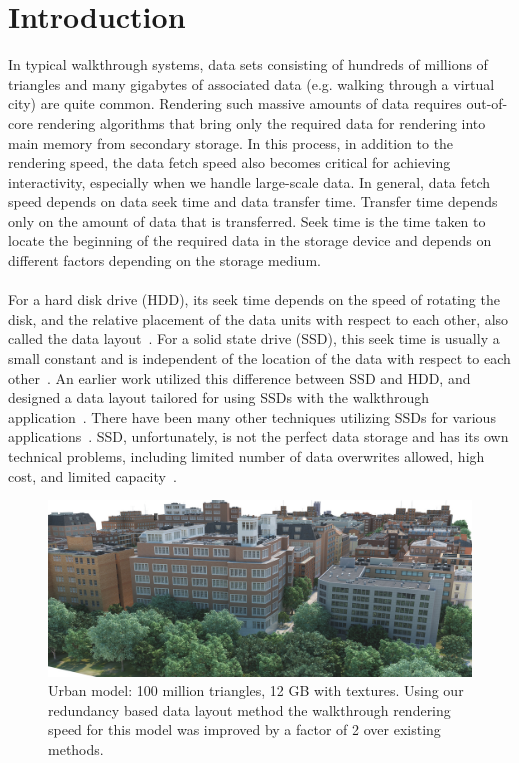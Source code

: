 \section{Introduction}


In typical walkthrough systems, data sets consisting of hundreds of millions of
triangles and many gigabytes of associated data (e.g. walking through a virtual
city) are quite common. Rendering such massive amounts of data requires
out-of-core rendering algorithms that bring only the required data for
rendering into main memory from secondary storage. In this process, in addition
to the rendering speed, the data fetch speed also becomes critical for
achieving interactivity, especially when we handle large-scale data. In
general, data fetch speed depends on data seek time and data transfer time.
Transfer time depends only on the amount of data that is transferred. Seek time
is the time taken to locate the beginning of the required data in the storage
device and depends on different factors depending on the storage medium. \\
\\
For a hard disk drive (HDD), its seek time depends on the speed of rotating the
disk,
and the relative placement of the data units with respect to each other, also
called the data layout~\cite{Rizvi10}. For a solid state drive (SSD), this seek
time is usually a small constant and is independent of the location of the data
with respect to each other~\cite{SSD_perf08}. An earlier work utilized this
difference between SSD and HDD, and designed a data layout tailored for using
SSDs with the walkthrough application~\cite{ssdpaper}. There have been many
other techniques utilizing SSDs for various applications~\cite{FlashVM09}. SSD,
unfortunately, is not the perfect data storage and has its own technical
problems, including limited number of data overwrites allowed, high cost, and
limited capacity~\cite{Rizvi10}. 
\begin{figure}[t]
  \centering
  \includegraphics[width=\columnwidth]{densecity.jpg}
  \caption{Urban model: 100 million triangles, 12 GB with textures. Using our redundancy based data layout method the walkthrough rendering speed for this model was improved by a factor of 2 over existing methods.}
  \label{fig:model3}
\end{figure}

